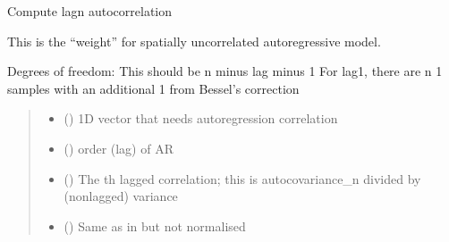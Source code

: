 \documentclass[letterpaper,10pt,english]{sphinxmanual}
\begin{document}
\begin{fulllineitems}
\label{\detokenize{kalman:glomar_gridding.autocorrelation.compute_autocorrelation.get_auto_corr}}
\pysigstartsignatures
\pysiglinewithargsret
{}
{\sphinxparamcomma {}}
{}
\pysigstopsignatures
\sphinxAtStartPar
Compute lag\sphinxhyphen{}n autocorrelation

\sphinxAtStartPar
This is the “weight” for spatially uncorrelated autoregressive model.

\sphinxAtStartPar
Degrees of freedom:
\sphinxhyphen{} This should be n minus lag minus 1
\sphinxhyphen{} For lag\sphinxhyphen{}1, there are n \sphinxhyphen{} 1 samples
with an additional \sphinxhyphen{}1 from Bessel’s correction
\begin{quote}\begin{description}
\begin{itemize}
\item {}
\sphinxAtStartPar
{} () \textendash{} 1D vector that needs autoregression correlation

\item {}
\sphinxAtStartPar
{} () \textendash{} order (lag) of AR

\end{itemize}

\sphinxAtStartPar
{}

\sphinxAtStartPar
\begin{itemize}
\item {}
\sphinxAtStartPar
{} () \textendash{} The \sphinxhyphen{}th lagged correlation; this is
autocovariance\_n divided by (non\sphinxhyphen{}lagged) variance

\item {}
\sphinxAtStartPar
{} () \textendash{} Same as in  but not normalised


\end{itemize}
\end{description}
\end{quote}
\end{fulllineitems}
\end{document}
